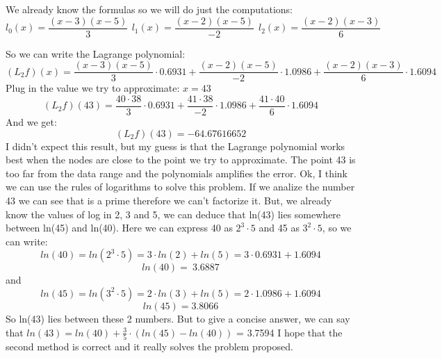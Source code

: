 \documentclass{article}
\begin{document}
We already know the formulas so we will do just the computations:
\[
    l_0(x) = \frac{(x-3)(x-5)}{3} \, \
    l_1(x) = \frac{(x-2)(x-5)}{-2} \ \
    l_2(x) = \frac{(x-2)(x-3)}{6}
\]

So we can write the Lagrange polynomial:
\[
    (L_2f)(x) = \frac{(x-3)(x-5)}{3} \cdot 0.6931 + \frac{(x-2)(x-5)}{-2} \cdot 1.0986 + \frac{(x-2)(x-3)}{6} \cdot 1.6094
\]
Plug in the value we try to approximate: \(x=43\)
\[
    (L_2f)(43) = \frac{40 \cdot 38}{3} \cdot 0.6931 + \frac{41 \cdot 38}{-2} \cdot 1.0986 + \frac{41 \cdot 40}{6} \cdot 1.6094
\]
And we get:
\[
    (L_2f)(43) = -64.67616652
\]
I didn't expect this result, but my guess is that the Lagrange polynomial
works best when the nodes are close to the point we try to approximate. The
point 43 is too far from the data range and the polynomials amplifies the
error.
\newline
Ok, I think we can use the rules of logarithms to solve this problem. If we
analize the number 43 we can see that is a prime therefore we can't factorize
it.
\newline
But, we already know the values of log in 2, 3 and 5, we can deduce that ln(43) lies somewhere between ln(45) and ln(40).
Here we can express 40 as \(2^3 \cdot 5\) and 45 as \(3^2 \cdot 5\), so we can write:
\[
    ln(40) = ln(2^3 \cdot 5) = 3 \cdot ln(2) + ln(5) = 3 \cdot 0.6931 + 1.6094
\]
\[
    ln(40) =~ 3.6887
\]
and
\[
    ln(45) = ln(3^2 \cdot 5) = 2 \cdot ln(3) + ln(5) = 2 \cdot 1.0986 + 1.6094
\]
\[
    ln(45) = 3.8066
\]
So ln(43) lies between these 2 numbers. But to give a concise answer,
we can say that \(ln(43) = ln(40) + \frac{3}{5} \cdot (ln(45) - ln(40))\) = 3.7594
\newline
\newline
I hope that the second method is correct and it really solves the problem proposed.
\end{document}
